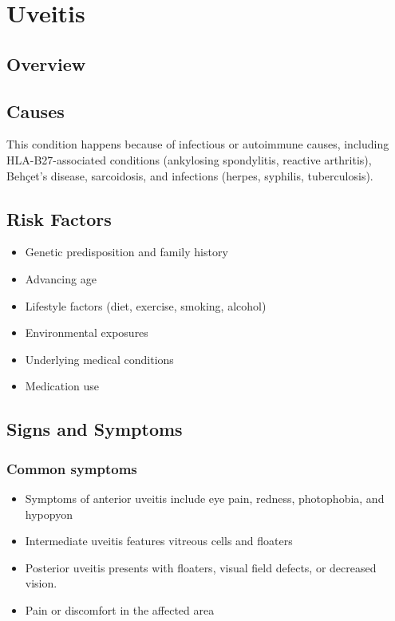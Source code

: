 \chapter{Uveitis}
\label{sec:Uveitis}

\section{Overview}

\section{Causes}
This condition happens because of infectious or autoimmune causes, including HLA-B27-associated conditions (ankylosing spondylitis, reactive arthritis), Beh\c{c}et's disease, sarcoidosis, and infections (herpes, syphilis, tuberculosis).     
\section{Risk Factors}

\begin{itemize}[noitemsep]
  \item Genetic predisposition and family history
  \item Advancing age
  \item Lifestyle factors (diet, exercise, smoking, alcohol)
  \item Environmental exposures
  \item Underlying medical conditions
  \item Medication use
\end{itemize}
\section{Signs and Symptoms}

\subsection{Common symptoms}
\begin{itemize}[noitemsep]
  \item Symptoms of anterior uveitis include eye pain, redness, photophobia, and hypopyon
  \item Intermediate uveitis features vitreous cells and floaters
  \item Posterior uveitis presents with floaters, visual field defects, or decreased vision.
  \item Pain or discomfort in the affected area
  \end{itemize}

